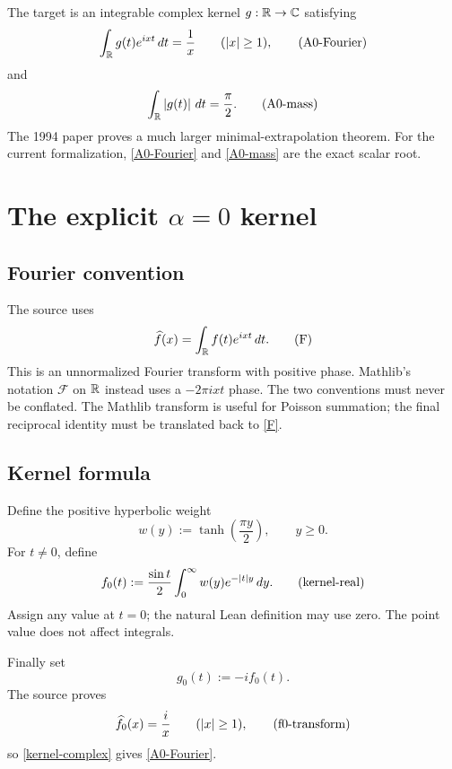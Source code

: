 The target is an integrable complex kernel $g:\mathbb{R}\to\mathbb{C}$ satisfying
\begin{equation}
  \int_{\mathbb{R}} g(t)e^{ixt}\,dt=\frac1x
  \qquad (\left\lvert x\right\rvert\ge1),
  \tag{A0-Fourier}\label{A0-Fourier}
\end{equation}
and
\begin{equation}
  \int_{\mathbb{R}}\left\lvert g(t)\right\rvert\,dt=\frac\pi2.
  \tag{A0-mass}\label{A0-mass}
\end{equation}
The 1994 paper proves a much larger minimal-extrapolation theorem. For the current formalization, \eqref{A0-Fourier} and \eqref{A0-mass} are the exact scalar root.

\section{The explicit $\alpha=0$ kernel}

\subsection{Fourier convention}

The source uses
\begin{equation}
  \widehat f(x)=\int_{\mathbb{R}}f(t)e^{ixt}\,dt.
  \tag{F}\label{F}
\end{equation}
This is an unnormalized Fourier transform with positive phase. Mathlib's notation $\mathcal F$ on $\mathbb{R}$ instead uses a $-2\pi ixt$ phase. The two conventions must never be conflated. The Mathlib transform is useful for Poisson summation; the final reciprocal identity must be translated back to \eqref{F}.

\subsection{Kernel formula}

Define the positive hyperbolic weight
\begin{equation}
  w(y):=\tanh\!\left(\frac{\pi y}{2}\right),
  \qquad y\ge0.
  \tag{weight}\label{weight}
\end{equation}
For $t\ne0$, define
\begin{equation}
  f_0(t)
  :=\frac{\sin t}{2}
     \int_0^\infty w(y)e^{-\left\lvert t\right\rvert y}\,dy.
  \tag{kernel-real}\label{kernel-real}
\end{equation}
Assign any value at $t=0$; the natural Lean definition may use zero. The point value does not affect integrals.

Finally set
\begin{equation}
  g_0(t):=-i f_0(t).
  \tag{kernel-complex}\label{kernel-complex}
\end{equation}
The source proves
\begin{equation}
  \widehat f_0(x)=\frac{i}{x}
  \qquad(\left\lvert x\right\rvert\ge1),
  \tag{f0-transform}\label{f0-transform}
\end{equation}
so \eqref{kernel-complex} gives \eqref{A0-Fourier}.


